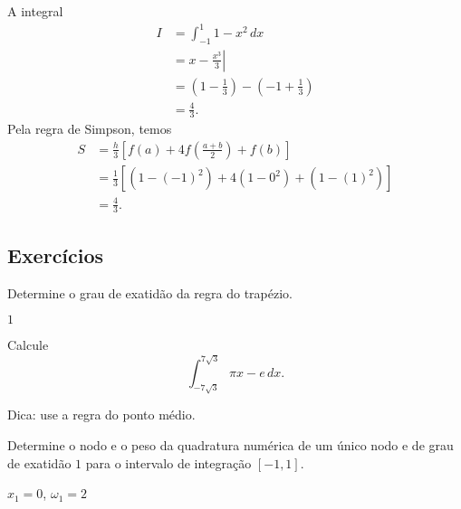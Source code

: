 \begin{ex}
  A integral
  \begin{subequations}
    \begin{align}
      I &= \int_{-1}^1 1-x^2\,dx\\
        &= \left. x - \frac{x^3}{3}\right|\\
        &= \left(1 - \frac{1}{3}\right) - \left(-1 + \frac{1}{3}\right)\\
        &= \frac{4}{3}.
    \end{align}
  \end{subequations}
  Pela regra de Simpson, temos
  \begin{subequations}
    \begin{align}
      S &= \frac{h}{3}\left[f(a) + 4f\left(\frac{a+b}{2}\right) + f(b)\right]\\
        &= \frac{1}{3}\left[(1-(-1)^2) + 4(1-0^2) + (1-(1)^2)\right]\\
        &= \frac{4}{3}.
    \end{align}
  \end{subequations}
\end{ex}

\subsection{Exercícios}

\begin{exer}
  Determine o grau de exatidão da regra do trapézio.
\end{exer}
\begin{resp}
  $1$
\end{resp}

\begin{exer}
  Calcule
  \begin{equation}
    \int_{-7\sqrt{3}}^{7\sqrt{3}} \pi x - e\,dx.
  \end{equation}
\end{exer}
\begin{resp}
  Dica: use a regra do ponto médio.
\end{resp}

\begin{exer}
  Determine o nodo e o peso da quadratura numérica de um único nodo e de grau de exatidão $1$ para o intervalo de integração $[-1, 1]$.
\end{exer}
\begin{resp}
  $x_1=0$, $\omega_1=2$
\end{resp}

